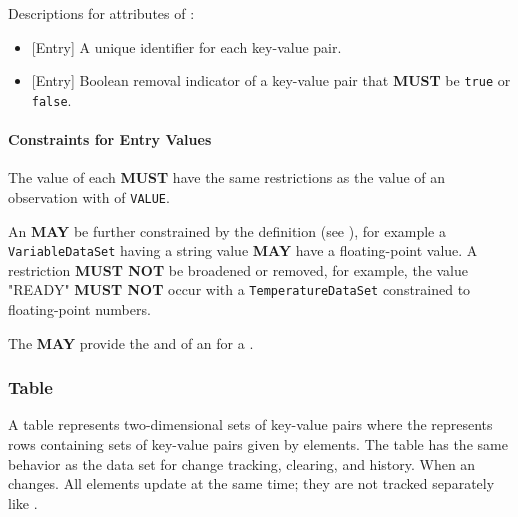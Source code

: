 Descriptions for attributes of :

\begin{itemize}

\item {}[Entry] \newline A unique identifier for each \gls{key-value pair}.

\item {}[Entry] \newline Boolean removal indicator of a \gls{key-value pair} that \textbf{MUST} be \texttt{true} or \texttt{false}.
\end{itemize}


\paragraph{Constraints for Entry Values}
\label{sec:Constraints for Entry Values}

The value of each  \textbf{MUST} have the same restrictions as the value of an \gls{observation} with  of \texttt{VALUE}.

An  \textbf{MAY} be further constrained by the  definition (see ), for example a \texttt{VariableDataSet} having a string value \textbf{MAY} have a floating-point  value. A restriction \textbf{MUST NOT} be broadened or removed, for example, the value "READY" \textbf{MUST NOT} occur with a \texttt{TemperatureDataSet} constrained to floating-point numbers.

The    \textbf{MAY} provide the  and  of an  for a .

\subsubsection{Table}
\label{sec:Table}



A \gls{table} represents two-dimensional sets of \glspl{key-value pair} where the  represents rows containing sets of \glspl{key-value pair} given by  elements. The \gls{table} has the same behavior as the \gls{data set} for change tracking, clearing, and history. When an  changes. All  elements update at the same time; they are not tracked separately like .

